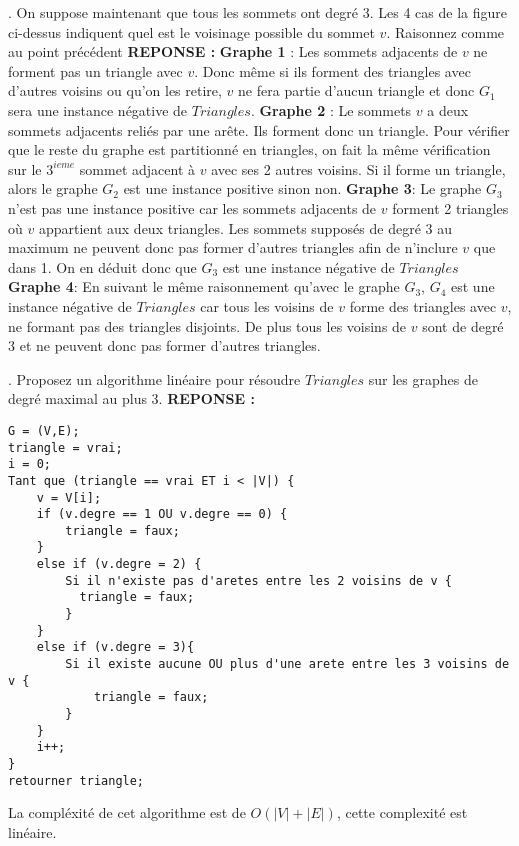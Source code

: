 \documentclass{article}
\begin{document}
. On suppose maintenant que tous les sommets ont degré 3.
Les 4 cas de la figure ci-dessus indiquent quel est le voisinage possible du sommet $v$. Raisonnez comme au point précédent
\smallbreak
\noindent \textbf{REPONSE :} \smallbreak
\noindent\textbf{Graphe 1} : Les sommets adjacents de $v$ ne forment pas un triangle avec $v$. Donc même si ils forment des triangles avec d'autres voisins ou qu'on les retire, $v$ ne fera partie d'aucun triangle et donc $G_{1}$ sera une instance négative de $Triangles$.
\smallbreak
\noindent \textbf{Graphe 2} : Le sommets $v$ a deux sommets adjacents reliés par une arête. Ils forment donc un triangle. Pour vérifier que le reste du graphe est partitionné en triangles, on fait la même vérification sur le $3^{ieme}$ sommet adjacent à $v$ avec ses 2 autres voisins. Si il forme un triangle, alors le graphe $G_{2}$ est une instance positive sinon non.
\smallbreak
\noindent \textbf{Graphe 3}: Le graphe $G_{3}$ n'est pas une instance positive car les sommets adjacents de $v$ forment 2 triangles où $v$ appartient aux deux triangles. Les sommets supposés de degré 3 au maximum ne peuvent donc pas former d'autres triangles afin de n'inclure $v$ que dans 1. On en déduit donc que $G_{3}$ est une instance négative de $Triangles$ 
\smallbreak
\noindent \textbf{Graphe 4}: En suivant le même raisonnement qu'avec le graphe $G_{3}$, $G_{4}$ est une instance négative de $Triangles$ car tous les voisins de $v$ forme des triangles avec $v$, ne formant pas des triangles disjoints. De plus tous les voisins de $v$ sont de degré 3 et ne peuvent donc pas former d'autres triangles.
\bigbreak

. Proposez un algorithme linéaire pour résoudre $Triangles$ sur les graphes de degré maximal au plus 3.
\smallbreak
\noindent \textbf{REPONSE :}
\smallbreak
\begin{lstlisting}[caption=Algortihme Triangles]
G = (V,E);
triangle = vrai;
i = 0;
Tant que (triangle == vrai ET i < |V|) {
    v = V[i];
    if (v.degre == 1 OU v.degre == 0) {
        triangle = faux;
    }
    else if (v.degre = 2) {
        Si il n'existe pas d'aretes entre les 2 voisins de v {
          triangle = faux;
        }
    }
    else if (v.degre = 3){
        Si il existe aucune OU plus d'une arete entre les 3 voisins de v {
            triangle = faux;
        }
    }
    i++;
}
retourner triangle;
\end{lstlisting}
\bigbreak
La compléxité de cet algorithme est de $O(|V| + |E|)$, cette complexité est linéaire.
\bigbreak
\end{document}
